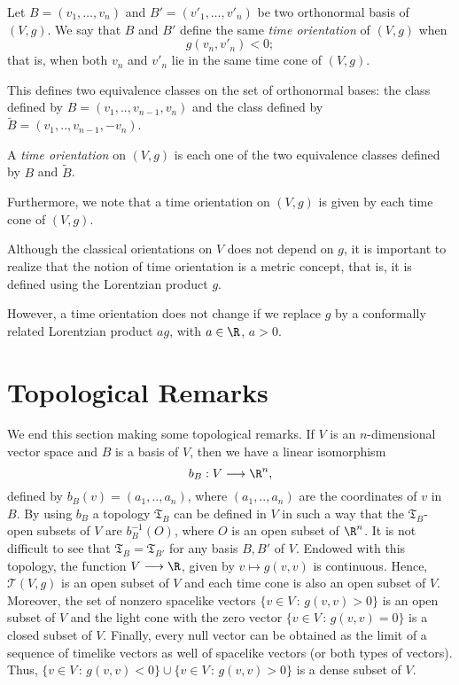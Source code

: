 Let $B = (v_1, \dots, v_n)$ and $B' = (v'_1, \dots, v'_n)$ be two orthonormal basis of $(V,g)$. We say that $B$ and $B'$ define the same \emph{time orientation} of $(V,g)$ when
\[
	g(v_n, v'_n) < 0;
\]
that is, when both $v_n$ and $v'_n$ lie in the same time cone of $(V,g)$.

This defines two equivalence classes on the set of orthonormal bases: the class defined by $B=(v_1,..,v_{n-1},v_n)$ and the class defined by $\tilde{B}=(v_1,..,v_{n-1},-v_n)$.

\begin{definition}
	\label{def:vstimeorientation}
	A \emph{time orientation} on $(V,g)$ is each one of the two equivalence classes defined by $B$ and $\tilde{B}$.
\end{definition}

Furthermore, we note that a time orientation on $(V,g)$ is given by each time cone of $(V,g)$.

Although the classical orientations on $V$ does not depend on $g$, it is important to realize that the notion of time orientation is a metric concept, that is, it is defined using the Lorentzian product $g$.

However, a time orientation does not change if we replace $g$ by a conformally related Lorentzian product $ag$, with $a\in \R$, $a>0$.

\section{Topological Remarks}
\label{sec:toporemarks}

We end this section making some topological remarks. If $V$ is an $n$-dimensional vector space and $B$ is a basis of $V$, then we have a linear isomorphism $$b_B : V \longrightarrow \R^n,$$ defined by $b_B(v)=(a_1,..,a_n)$, where $(a_1,..,a_n)$ are the coordinates of $v$ in $B$. By using $b_B$ a topology $\mathfrak{T}_B$ can be defined in $V$ in such a way that the $\mathfrak{T}_B$-open subsets of $V$ are $b_B^{-1}(O)$, where $O$ is an open subset of $\R^n$. It is not difficult to see that $\mathfrak{T}_B = \mathfrak{T}_{B'}$ for any basis $B,B'$ of $V$. Endowed with this topology, the function $V \longrightarrow \R$, given by $v \mapsto g(v,v)$ is continuous. Hence, $\mathcal{T}(V,g)$ is an open subset of $V$ and each time cone is also an open subset of $V$. Moreover, the set of nonzero spacelike vectors $\{v\in V \, : \, g(v,v)>0 \}$ is an open subset of $V$ and the light cone with the zero vector $\{v\in V \, : \, g(v,v)=0 \}$ is a closed subset of $V$. Finally, every null vector can be obtained as the limit of a sequence of timelike vectors as well of spacelike vectors (or both types of vectors). Thus, $\{v\in V \, : \, g(v,v)<0 \} \cup \{v\in V \, : \, g(v,v)>0 \}$
is a dense subset of $V$.
